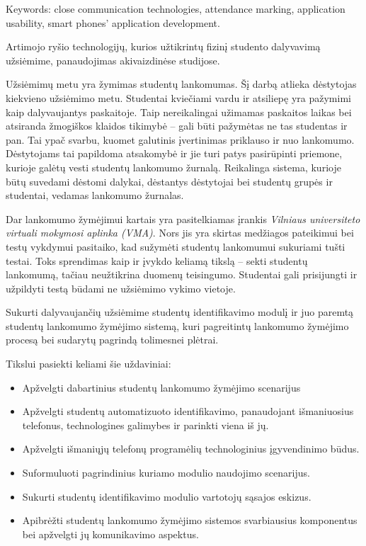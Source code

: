 \documentclass{VUMIFPSbakalaurinis}
\begin{document}
Keywords: close communication technologies, attendance marking, application usability, smart phones' application development.

\tableofcontents



Artimojo ryšio technologijų, kurios užtikrintų fizinį studento dalyvavimą užsiėmime, panaudojimas akivaizdinėse studijose.


Užsiėmimų metu yra žymimas studentų lankomumas. Šį darbą atlieka dėstytojas kiekvieno užsiėmimo metu. Studentai kviečiami vardu ir atsiliepę yra pažymimi kaip dalyvaujantys paskaitoje. Taip nereikalingai užimamas paskaitos laikas bei atsiranda žmogiškos klaidos tikimybė – gali būti pažymėtas ne tas studentas ir pan. Tai ypač svarbu, kuomet galutinis įvertinimas priklauso ir nuo lankomumo. Dėstytojams tai papildoma atsakomybė ir jie turi patys pasirūpinti priemone, kurioje galėtų vesti studentų lankomumo žurnalą. Reikalinga sistema, kurioje būtų suvedami dėstomi dalykai, dėstantys dėstytojai bei studentų grupės ir studentai, vedamas lankomumo žurnalas.

Dar lankomumo žymėjimui kartais yra pasitelkiamas įrankis \textit{Vilniaus universiteto virtuali mokymosi aplinka (VMA)}. Nors jis yra skirtas medžiagos pateikimui bei testų vykdymui pasitaiko, kad sužymėti studentų lankomumui sukuriami tušti testai. Toks sprendimas kaip ir įvykdo keliamą tikslą – sekti studentų lankomumą, tačiau neužtikrina duomenų teisingumo. Studentai gali prisijungti ir užpildyti testą būdami ne užsiėmimo vykimo vietoje.


Sukurti dalyvaujančių užsiėmime studentų identifikavimo modulį ir juo paremtą studentų lankomumo žymėjimo sistemą, kuri pagreitintų lankomumo žymėjimo procesą bei sudarytų pagrindą tolimesnei plėtrai.


Tikslui pasiekti keliami šie uždaviniai:

\begin{itemize}
    \item Apžvelgti dabartinius studentų lankomumo žymėjimo scenarijus
	\item Apžvelgti studentų automatizuoto identifikavimo, panaudojant išmaniuosius telefonus, technologines galimybes ir parinkti viena iš jų.
	\item Apžvelgti išmaniųjų telefonų programėlių technologinius įgyvendinimo būdus.
	\item Suformuluoti pagrindinius kuriamo modulio naudojimo scenarijus.
	\item Sukurti studentų identifikavimo modulio vartotojų sąsajos eskizus.
	\item Apibrėžti studentų lankomumo žymėjimo sistemos svarbiausius komponentus bei apžvelgti jų komunikavimo aspektus.
\end{itemize}
\end{document}
